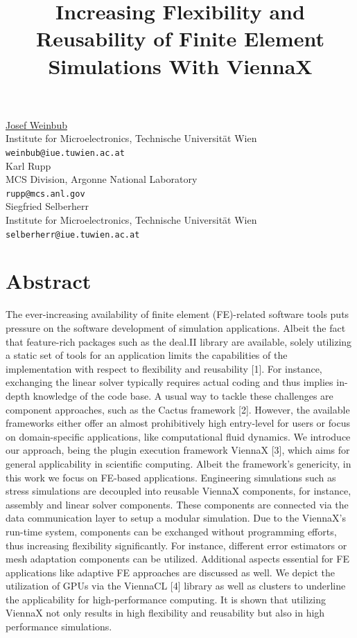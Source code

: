 \documentclass[article, A4, 11pt]{llncs}%
\begin{document}
\title{Increasing Flexibility and Reusability of Finite Element Simulations With ViennaX}
 \author{} \institute{}
\maketitle
\begin{center}
{\large \underline{Josef Weinbub}}\\
Institute for Microelectronics, Technische Universität Wien\\
{\tt weinbub@iue.tuwien.ac.at}
\\ \vspace{4mm}
{\large Karl Rupp}\\
MCS Division, Argonne National Laboratory\\
{\tt rupp@mcs.anl.gov}
\\ \vspace{4mm}
{\large Siegfried Selberherr}\\
Institute for Microelectronics, Technische Universität Wien\\
{\tt selberherr@iue.tuwien.ac.at}
\end{center}

\section*{Abstract}
The ever-increasing availability of finite element (FE)-related software tools puts pressure on the software development of simulation applications. Albeit the fact that feature-rich packages such as the deal.II library are available, solely utilizing a static set of tools for an application limits the capabilities of the implementation with respect to flexibility and reusability [1]. For instance, exchanging the linear solver typically requires actual coding and thus implies in-depth knowledge of the code base. A usual way to tackle these challenges are component approaches, such as the Cactus framework [2]. However, the available frameworks either offer an almost prohibitively high entry-level for users or focus on domain-specific applications, like computational fluid dynamics. We introduce our approach, being the plugin execution framework ViennaX [3], which aims for general applicability in scientific computing. Albeit the framework's genericity, in this work we focus on FE-based applications. Engineering simulations such as stress simulations are decoupled into reusable ViennaX components, for instance, assembly and linear solver components. These components are connected via the data communication layer to setup a modular simulation. Due to the ViennaX's run-time system, components can be exchanged without programming efforts, thus increasing flexibility significantly. For instance, different error estimators or mesh adaptation components can be utilized. Additional aspects essential for FE applications like adaptive FE approaches are discussed as well. We depict the utilization of GPUs via the ViennaCL [4] library as well as clusters to underline the applicability for high-performance computing. It is shown that utilizing ViennaX not only results in high flexibility and reusability but also in high performance simulations. 
\end{document}
